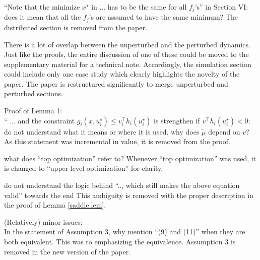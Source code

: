 \documentclass[journal,twoside,web]{ieeecolor}
\begin{document}
{\color{red}“Note that the minimize $x^\star$  in ...  has to be the same for all $f_j$’s” in Section VI: does it mean that all the $f_j$’s are assumed to have the same minimum?} {\color{blue} 
The distributed section is removed from the paper.}

{\color{red}There is a lot of overlap between the unperturbed and the perturbed dynamics. Just like the proofs, the entire discussion of one of these could be moved to the supplementary material for a technical note. Accordingly, the simulation section could include only one case study which clearly highlights the novelty of the paper.} {\color{blue} The paper is restructured significantly to merge unperturbed and perturbed sections.} 

Proof of Lemma 1:\\
{\color{red}“ ...  and the constraint $g_i(x, u_i^\star) \leq v_i^\top h_i(u_i^\star)$ is strengthen if $v^\top h_i(u_i^\star)<0$: do not understand what it means or where it is used. why does $\tilde \mu$ depend on $v$?} {\color{blue} As this statement was incremental in value, it is removed from the proof.}

{\color{red}what does “top optimization” refer to?} {\color{blue} Whenever “top optimization” was used, it is changed to “upper-level optimization” for clarity.}

{\color{red}do not understand the logic behind “.., which still makes the above equation valid” towards the end} {\color{blue} This ambiguity is removed with the proper description in the proof of Lemma \ref{saddle.lem}.}
 

(Relatively) minor issues:\\
{\color{red}In the statement of Assumption 3, why mention “(9) and (11)” when they are both equivalent.} {\color{blue} This was to emphasizing the equivalence. Assumption 3 is removed in the new version of the paper.}
\end{document}
